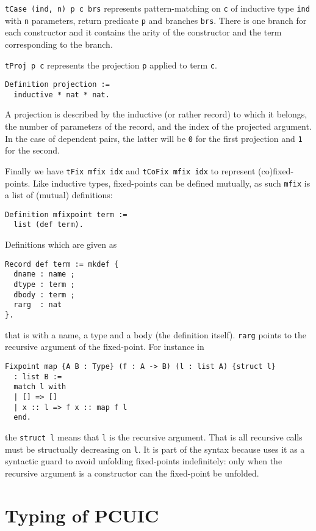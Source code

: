 \texttt{tCase (ind, n) p c brs} represents pattern-matching on
\texttt{c} of inductive type \texttt{ind} with
\texttt{n} parameters, return predicate \texttt{p}
and branches \texttt{brs}.
There is one branch for each constructor and it contains the arity of the
constructor and the term corresponding to the branch.

\texttt{tProj p c} represents the projection \texttt{p}
applied to term \texttt{c}.
\begin{verbatim}
Definition projection :=
  inductive * nat * nat.
\end{verbatim}
A projection is described by the inductive (or rather record) to which it
belongs, the number of parameters of the record, and the index of the projected
argument. In the case of dependent pairs, the latter will be \texttt{0}
for the first projection and \texttt{1} for the second.

Finally we have \texttt{tFix mfix idx} and
\texttt{tCoFix mfix idx} to represent (co)fixed-points.
Like inductive types, fixed-points can be defined mutually, as such
\texttt{mfix} is a list of (mutual) definitions:
\begin{verbatim}
Definition mfixpoint term :=
  list (def term).
\end{verbatim}
Definitions which are given as
\begin{verbatim}
Record def term := mkdef {
  dname : name ;
  dtype : term ;
  dbody : term ;
  rarg  : nat
}.
\end{verbatim}
that is with a name, a type and a body (the definition itself).
\texttt{rarg} points to the recursive argument of the fixed-point.
For instance in
\begin{verbatim}
Fixpoint map {A B : Type} (f : A -> B) (l : list A) {struct l}
  : list B :=
  match l with
  | [] => []
  | x :: l => f x :: map f l
  end.
\end{verbatim}
the \texttt{{struct l}} means that \texttt{l} is the recursive
argument. That is all recursive calls must be structually decreasing on
\texttt{l}. It is part of the syntax because \Coq uses it as a
syntactic guard to avoid unfolding fixed-points indefinitely: only when the
recursive argument is a constructor can the fixed-point be unfolded.

\section{Typing of \acrshort{PCUIC}}

